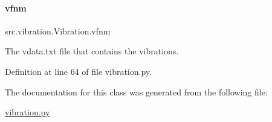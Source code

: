 \paragraph{\texorpdfstring{vfnm}{vfnm}}
{\footnotesize\ttfamily src.\+vibration.\+Vibration.\+vfnm}



The vdata.\+txt file that contains the vibrations. 



Definition at line 64 of file vibration.\+py.



The documentation for this class was generated from the following file\+:\begin{DoxyCompactItemize}
\item 
\hyperlink{vibration_8py}{vibration.\+py}\end{DoxyCompactItemize}
